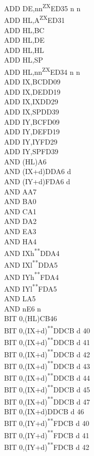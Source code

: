 \documentclass[12pt,twoside,openright,a4paper]{book}
\newcommand{\UNDOC}{\textnormal{\textsuperscript{**}}}
\newcommand{\ZXN}{\textnormal{\textsuperscript{ZX}}}
\begin{document}
\begin{multicols}{3}
{\begin{tabbing}
	ADD DE,nn\ZXN\>ED35 n n\\
	ADD HL,A\ZXN\>ED31\\
	ADD HL,BC\\
	ADD HL,DE\\
	ADD HL,HL\\
	ADD HL,SP\\
	ADD HL,nn\ZXN\>ED34 n n\\
	ADD IX,BC\>DD09\\
	ADD IX,DE\>DD19\\
	ADD IX,IX\>DD29\\
	ADD IX,SP\>DD39\\
	ADD IY,BC\>FD09\\
	ADD IY,DE\>FD19\\
	ADD IY,IY\>FD29\\
	ADD IY,SP\>FD39\\
	AND (HL)\>A6\\
	AND (IX+d)\>DDA6 d\\
	AND (IY+d)\>FDA6 d\\
	AND A\>A7\\
	AND B\>A0\\
	AND C\>A1\\
	AND D\>A2\\
	AND E\>A3\\
	AND H\>A4\\
	AND IXh\UNDOC\>DDA4\\
	AND IXl\UNDOC\>DDA5\\
	AND IYh\UNDOC\>FDA4\\
	AND IYl\UNDOC\>FDA5\\
	AND L\>A5\\
	AND n\>E6 n\\
	BIT 0,(HL)\>CB46\\
	BIT 0,(IX+d)\UNDOC\>DDCB d 40\\
	BIT 0,(IX+d)\UNDOC\>DDCB d 41\\
	BIT 0,(IX+d)\UNDOC\>DDCB d 42\\
	BIT 0,(IX+d)\UNDOC\>DDCB d 43\\
	BIT 0,(IX+d)\UNDOC\>DDCB d 44\\
	BIT 0,(IX+d)\UNDOC\>DDCB d 45\\
	BIT 0,(IX+d)\UNDOC\>DDCB d 47\\
	BIT 0,(IX+d)\>DDCB d 46\\
	BIT 0,(IY+d)\UNDOC\>FDCB d 40\\
	BIT 0,(IY+d)\UNDOC\>FDCB d 41\\
	BIT 0,(IY+d)\UNDOC\>FDCB d 42\\

\end{tabbing}}
\end{multicols}
\end{document}
